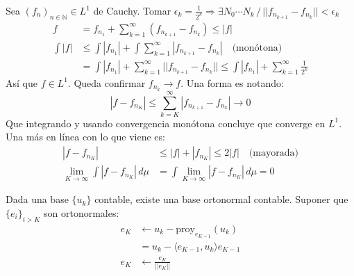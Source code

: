 \documentclass{book}
\begin{document}
\begin{teorema}[$L^1$ es completo]
    Sea $(f_n)_{n\in\mathbb{N}} \in L^1$ de Cauchy. Tomar $\epsilon_k = \frac{1}{2^k} \Rightarrow \exists N_0 \cdots N_k \,/\, || f_{n_{k+1}} - f_{n_k} || < \epsilon_k$
    \begin{align*}
        f &= f_{n_1} + \sum_{k=1}^{\infty}(f_{n_{k+1}} - f_{n_k}) \leq |f|\\
        \int |f| &\leq \int |f_{n_1}| + \int \sum_{k=1}^{\infty}|f_{n_{k+1}} - f_{n_k}| \quad\text{(mon\'otona)}\\
                 &= \int |f_{n_1}| + \sum_{k=1}^{\infty} ||f_{n_{k+1}} - f_{n_k}|| \leq \int |f_{n_1}| + \sum_{k=1}^{\infty} \frac{1}{2^k}
    \end{align*}
    As\'i que $f \in L^1$. Queda confirmar $f_{n_k} \to f$. Una forma es notando:
        $$|f - f_{n_K}| \leq \sum_{k=K}^{\infty}|f_{n_{k+1}} - f_{n_k}| \to 0$$
    Que integrando y usando convergencia mon\'otona concluye que converge en $L^1$. Una m\'as en l\'inea con lo que viene es:
    \begin{align*}
        |f - f_{n_K}| &\leq |f| + |f_{n_K}| \leq 2|f| \quad \text{(mayorada)}\\
        \lim_{K\to\infty}\int|f - f_{n_K}|\, d\mu &= \int\lim_{K\to\infty}|f - f_{n_K}|\, d\mu = 0
    \end{align*}
\end{teorema}
\begin{teorema}
\end{teorema}
\begin{teorema}
    Dada una base $\{u_k\}$ contable, existe una base ortonormal contable. Suponer que $\{e_i\}_{i>K}$ son ortonormales:
    \begin{align*}
        e_K &\leftarrow u_k - \text{proy}_{e_{K-1}}(u_k)\\
            &= u_k - \langle e_{K-1}, u_k \rangle e_{K-1}\\
        e_K &\leftarrow \frac{e_K}{||e_K||}
    \end{align*}
\end{teorema}
\end{document}
